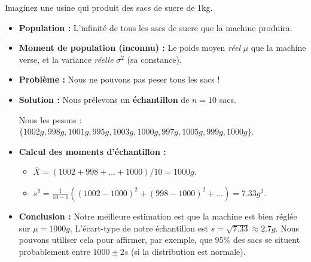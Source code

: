 \begin{examplebox}
Imaginez une usine qui produit des sacs de sucre de 1kg.
\begin{itemize}
    \item \textbf{Population :} L'infinité de tous les sacs de sucre que la machine produira.
    \item \textbf{Moment de population (inconnu) :} Le poids moyen \textit{réel} $\mu$ que la machine verse, et la variance \textit{réelle} $\sigma^2$ (sa constance).
    \item \textbf{Problème :} Nous ne pouvons pas peser tous les sacs !
    \item \textbf{Solution :} Nous prélevons un \textbf{échantillon} de $n=10$ sacs.
    
    Nous les pesons : $\{ 1002g, 998g, 1001g, 995g, 1003g, 1000g, 997g, 1005g, 999g, 1000g \}$.
    
    \item \textbf{Calcul des moments d'échantillon :}
    \begin{itemize}
        \item $\bar{X} = (1002 + 998 + \dots + 1000) / 10 = 1000g$.
        \item $s^2 = \frac{1}{10-1} \left( (1002-1000)^2 + (998-1000)^2 + \dots \right) = 7.33 g^2$.
    \end{itemize}
    \item \textbf{Conclusion :} Notre meilleure estimation est que la machine est bien réglée sur $\mu = 1000g$. L'écart-type de notre échantillon est $s = \sqrt{7.33} \approx 2.7g$. Nous pouvons utiliser cela pour affirmer, par exemple, que 95\% des sacs se situent probablement entre $1000 \pm 2s$ (si la distribution est normale).
\end{itemize}
\end{examplebox}

